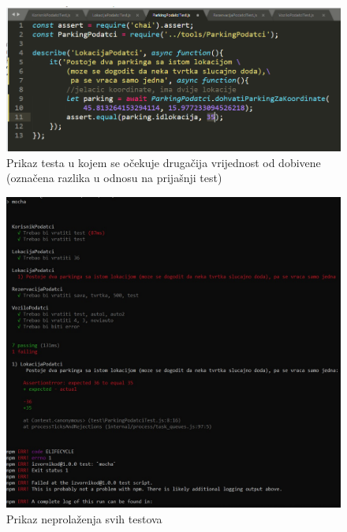 			\begin{figure}[H]
				\includegraphics[scale=0.6]{slike/test_unit_kriviTest.png} %
				\centering
				\caption{Prikaz testa u kojem se očekuje drugačija vrijednost od dobivene (označena razlika u odnosu na prijašnji test)}
				\label{fig:test - user - test s neocekivanom vrijednosti}
			\end{figure}		
		
		
			\begin{figure}[H]
				\includegraphics[scale=0.4]{slike/test_unit_testNeOK.jpg} %
				\centering
				\caption{Prikaz neprolaženja svih testova}
				\label{fig:test - user - neprolazenje svih testova}
			\end{figure}	
				
